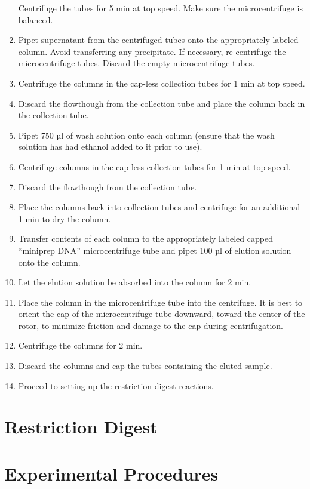 \documentclass[]{book}
\theoremstyle{definition}
\theoremstyle{definition}
\theoremstyle{definition}
\theoremstyle{remark}
\begin{document}
\begin{enumerate}
  Centrifuge the tubes for 5 min at top speed. Make sure the
  microcentrifuge is balanced.
\item
  Pipet supernatant from the centrifuged tubes onto the appropriately
  labeled column. Avoid transferring any precipitate. If necessary,
  re-centrifuge the microcentrifuge tubes. Discard the empty
  microcentrifuge tubes.
\item
  Centrifuge the columns in the cap-less collection tubes for 1 min at
  top speed.
\item
  Discard the flowthough from the collection tube and place the column
  back in the collection tube.
\item
  Pipet 750 µl of wash solution onto each column (ensure that the wash
  solution has had ethanol added to it prior to use).
\item
  Centrifuge columns in the cap-less collection tubes for 1 min at top
  speed.
\item
  Discard the flowthough from the collection tube.
\item
  Place the columns back into collection tubes and centrifuge for an
  additional 1 min to dry the column.
\item
  Transfer contents of each column to the appropriately labeled capped
  ``miniprep DNA'' microcentrifuge tube and pipet 100 µl of elution
  solution onto the column.
\item
  Let the elution solution be absorbed into the column for 2 min.
\item
  Place the column in the microcentrifuge tube into the centrifuge. It
  is best to orient the cap of the microcentrifuge tube downward, toward
  the center of the rotor, to minimize friction and damage to the cap
  during centrifugation.
\item
  Centrifuge the columns for 2 min.
\item
  Discard the columns and cap the tubes containing the eluted sample.
\item
  Proceed to setting up the restriction digest reactions.
\end{enumerate}

\section{Restriction Digest}\label{restriction-digest}

\section{Experimental Procedures}\label{experimental-procedures-16}
\end{document}
